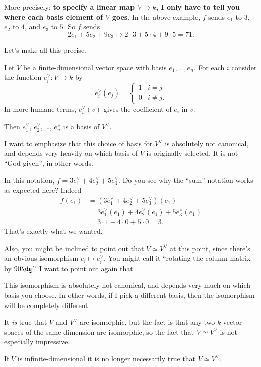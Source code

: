 More precisely: \textbf{to specify a linear map $V \to k$,
I only have to tell you where each basis element of $V$ goes}.
In the above example, $f$ sends $e_1$ to $3$, $e_2$ to $4$, and $e_3$ to $5$.
So $f$ sends \[ 2e_1 + 5e_2 + 9e_3 \mapsto 2 \cdot 3 + 5 \cdot 4 + 9 \cdot 5 = 71. \]

Let's make all this precise.
\begin{proposition}
	Let $V$ be a finite-dimensional vector space with basis $e_1, \dots, e_n$.
	For each $i$ consider the function $e_i^\vee : V \to k$ by
	\[
		e_i^\vee(e_j)
		= \begin{cases}
			1 & i=j \\
			0 & i \neq j.
		\end{cases}
	\]
	In more humane terms, $e_i^\vee(v)$ gives the coefficient of $e_i$ in $v$.

	Then $e_1^\vee$, $e_2^\vee$, \dots, $e_n^\vee$ is a basis of $V^\vee$.
\end{proposition}
I want to emphasize that this choice of basis for $V^\vee$ is absolutely not canonical, and depends very heavily on which basis of $V$ is originally selected.
It is not ``God-given'', in other words.

\begin{example}
	In this notation, $f = 3e_1^\vee + 4e_2^\vee + 5e_3^\vee$.
	Do you see why the ``sum'' notation works as expected here?
	Indeed
	\begin{align*}
		f(e_1) &= (3e_1^\vee + 4e_2^\vee + 5e_3^\vee)(e_1) \\
		&= 3e_1^\vee(e_1) + 4e_2^\vee(e_1) + 5e_3^\vee(e_1) \\
		&= 3 \cdot 1 + 4 \cdot 0 + 5 \cdot 0 = 3.
	\end{align*}
	That's exactly what we wanted.
\end{example}

Also, you might be inclined to point out that $V \simeq V^\vee$ at this point,
since there's an obvious isomorphism $e_i \mapsto e_i^\vee$.
You might call it ``rotating the column matrix by $90\dg$''.
I want to point out again that
\begin{itemize}
	\ii This isomorphism is absolutely not canonical,
	and depends very much on which basis you choose.
	In other words, if I pick a different basis, then the isomorphism
	will be completely different.

	It \emph{is} true that $V$ and $V^\vee$ are isomorphic,
	but the fact is that any two $k$-vector spaces of the same dimension are isomorphic,
	so the fact that $V \simeq V^\vee$ is not especially impressive.
	
	\ii If $V$ is infinite-dimensional it is no longer necessarily true that $V \simeq V^\vee$.
\end{itemize}

